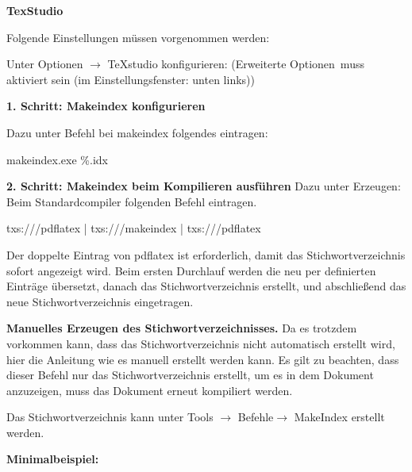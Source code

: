         \textbf{TexStudio}

        Folgende Einstellungen müssen vorgenommen werden:

        Unter Optionen $\rightarrow$ TeXstudio konfigurieren:
        (\glqq Erweiterte Optionen\grqq \ muss aktiviert sein (im Einstellungsfenster: unten links))

        \textbf{1. Schritt: Makeindex konfigurieren}

        Dazu unter Befehl bei makeindex folgendes eintragen:

        makeindex.exe \%.idx


\textbf{ 2. Schritt: Makeindex beim Kompilieren ausführen}
Dazu unter Erzeugen: Beim Standardcompiler folgenden Befehl eintragen.

txs:///pdflatex | txs:///makeindex | txs:///pdflatex

Der doppelte Eintrag von pdflatex ist erforderlich, damit das Stichwortverzeichnis sofort angezeigt wird. Beim ersten Durchlauf werden die neu per  definierten Einträge übersetzt, danach das Stichwortverzeichnis erstellt, und abschließend das neue Stichwortverzeichnis eingetragen.

\textbf{Manuelles Erzeugen des Stichwortverzeichnisses.}
Da es trotzdem vorkommen kann, dass das Stichwortverzeichnis nicht automatisch erstellt wird, hier die Anleitung wie es manuell erstellt werden kann. Es gilt zu beachten, dass dieser Befehl nur das Stichwortverzeichnis erstellt, um es in dem Dokument anzuzeigen, muss das Dokument erneut kompiliert werden.

Das Stichwortverzeichnis kann unter Tools $\rightarrow$ Befehle$\rightarrow$ MakeIndex erstellt werden.

        \vspace{1em}
        \textbf{Minimalbeispiel:}
        \vspace{1em}

